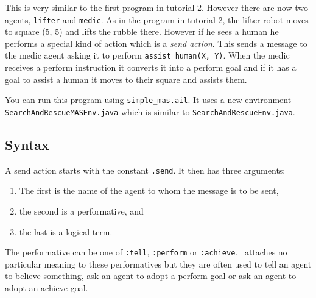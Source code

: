 This is very similar to the first program in tutorial 2.  However  there are now two agents, \texttt{lifter} and \texttt{medic}.  As in the program in tutorial 2, the lifter robot moves to square (5, 5) and lifts the rubble there.  However if he sees a human he performs a special kind of action which is a \emph{send action}.  This sends a message to the medic agent asking it to perform \texttt{assist\_human(X, Y)}.  When the medic receives a perform instruction it converts it into a perform goal and if it has a goal to assist a human it moves to their square and assists them.

\begin{sloppypar}
You can run this program using \texttt{simple\_mas.ail}.  It uses a new environment \texttt{SearchAndRescueMASEnv.java} which is similar to \texttt{SearchAndRescueEnv.java}.
\end{sloppypar}

\subsection{Syntax}

A send action starts with the constant \texttt{.send}.  It then has three arguments:
\begin{enumerate}
\item The first is the name of the agent to whom the message is to be sent, 
\item the second is a performative, and 
\item the last is a logical term.  
\end{enumerate}
The performative can be one of \texttt{:tell}, \texttt{:perform} or \texttt{:achieve}.  \gwendolen\ attaches no particular meaning to these performatives but they are often used to tell an agent to believe something, ask an agent to adopt a perform goal or ask an agent to adopt an achieve goal.

